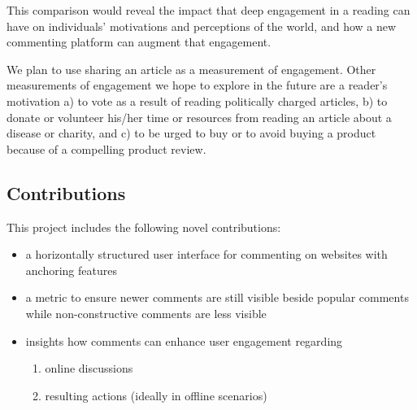This comparison would reveal the impact that deep engagement in a reading can have on individuals' motivations and perceptions of the world, and how a new commenting platform can augment that engagement.
 
We plan to use sharing an article as a measurement of engagement. Other measurements of engagement we hope to explore in the future are a reader's motivation a) to vote as a result of reading politically charged articles, b) to donate or volunteer his/her time or resources from reading an article about a disease or charity, and c) to be urged to buy or to avoid buying a product because of a compelling product review.


\subsection{Contributions}

This project includes the following novel contributions:

\begin{itemize}
\item a horizontally structured user interface for commenting on websites with anchoring features
\item a metric to ensure newer comments are still visible beside popular comments while non-constructive comments are less visible
\item insights how comments can enhance user engagement regarding
\begin{enumerate}
\item online discussions
\item resulting actions (ideally in offline scenarios)
\end{enumerate}

\end{itemize}